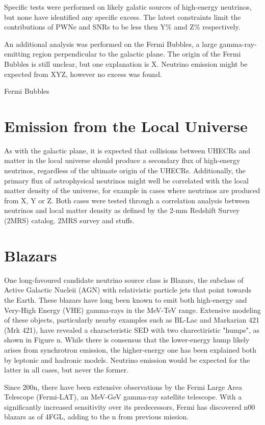 Specific tests were performed on likely galatic sources of high-energy neutrinos, but none have identified any specific excess. The latest constraints limit the contributions of PWNe and SNRs to be less then Y\% amd Z\% respectively. 

An additional analysis was performed on the Fermi Bubbles, a large gamma-ray-emitting region perpendicular to the galactic plane. The origin of the Fermi Bubbles is still unclear, but one explanation is X. Neutrino emission might be expected from XYZ, however no excess was found. 

Fermi Bubbles
\section{Emission from the Local Universe}
As with the galactic plane, it is expected that collisions between UHECRs and matter in the local universe should produce a secondary flux of high-energy neutrinos, regardless of the ultimate origin of the UHECRs. Additionally, the primary flux of astrophysical neutrinos might well be correlated with the local matter density of the universe, for example in cases where neutrinos are produced from X, Y or Z. Both cases were tested through a correlation analysis between neutrinos and local matter density as defined by the 2-mm Redshift Survey (2MRS) catalog. 
2MRS survey and stuffs.

\section{Blazars}
One long-favoured candidate neutrino source class is Blazars, the subclass of Active Galactic Nucleii (AGN) with relativistic particle jets that point towards the Earth. These blazars have long been known to emit both high-energy  and Very-High Energy (VHE) gamma-rays in the MeV-TeV range. Extensive modeling of these objects, particularly nearby examples such as BL-Lac and Markarian 421 (Mrk 421), have revealed a characteristic SED with two charectiristic "humps", as shown in Figure n. While there is consensus that the lower-energy hump likely arises from synchrotron emission,  the higher-energy one has been explained both by leptonic and hadronic models. Neutrino emission would be expected for the latter in all cases, but never the former.

Since 200n, there have been extensive observations by the Fermi Large Area Telescope (Fermi-LAT), an MeV-GeV gamma-ray satellite telescope. With a significantly increased sensitivity over its predecessors, Fermi has discovered n00 blazars as of 4FGL, adding to the  n from previous mission.

